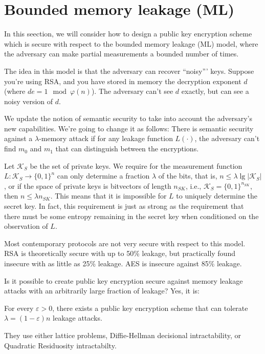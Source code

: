 \documentclass[10pt]{article}
\newcommand{\bit}{\{0,1\}}
\newcommand{\keys}{\mathcal{K}}
\begin{document}
\section{Bounded memory leakage (ML)}

In this seection, we will consider how to design a public key encryption scheme which is secure with respect to the bounded memory leakage (ML) model, where the adversary can make partial measurements a bounded number of times.

The idea in this model is that the adversary can recover ``noisy''' keys. Suppose you're using RSA, and you have stored in memory the decryption exponent $d$ (where $d e = 1 \mod \varphi(n)$). The adversary can't see $d$ exactly, but can see a noisy version of $d$. 

We update the notion of semantic security to take into account the adversary's new capabilities. We're going to change it as follows: There is semantic security against a $\lambda$-memory attack if for any leakage function $L(\cdot)$, the adversary can't find $m_0$ and $m_1$ that can distinguish between the encryptions.

Let $\keys_S$ be the set of private keys. We require for the measurement function $L : \keys_S \to \bit^n$ can only determine a fraction $\lambda$ of the bits, that is, $n \le \lambda \lg |\keys_S|$, or if the space of private keys is bitvectors of length $n_{SK}$, i.e., $\keys_S = \bit^{n_{SK}}$, then $n \le \lambda n_{SK}$. This means that it is impossible for $L$ to uniquely determine the secret key. In fact, this requirement is just as strong as the requirement that there must be some entropy remaining in the secret key when conditioned on the observation of $L$.

Most contemporary protocols are not very secure with respect to this model. RSA is theoretically secure with up to 50\% leakage, but practically found insecure with as little as 25\% leakage. AES is insecure against 85\% leakage.

Is it possible to create public key encryption secure against memory leakage attacks with an arbitrarily large fraction of leakage? Yes, it is:

\begin{theorem}
For every $\varepsilon > 0$, there exists a public key encryption scheme that can tolerate $\lambda = (1 - \varepsilon)n$ leakage attacks.
\end{theorem}
They use either lattice problems, Diffie-Hellman decisional intractability, or Quadratic Residuosity intractabilty.
\end{document}
